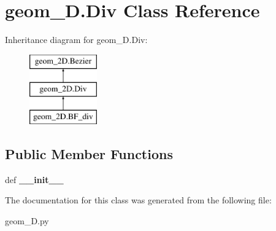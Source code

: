 \hypertarget{classgeom__2D_1_1Div}{\section{geom\-\_\-D.\-Div \-Class \-Reference}
\label{classgeom__2D_1_1Div}
}
\-Inheritance diagram for geom\-\_\-D.\-Div\-:\begin{figure}[H]
\begin{center}
\leavevmode
\includegraphics[height=3.000000cm]{classgeom__2D_1_1Div}
\end{center}
\end{figure}
\subsection*{\-Public \-Member \-Functions}
\begin{DoxyCompactItemize}
\item 
\hypertarget{classgeom__2D_1_1Div_aa765d65f15eebda96d87be39d9570808}{def {\bfseries \-\_\-\-\_\-init\-\_\-\-\_\-}}\label{classgeom__2D_1_1Div_aa765d65f15eebda96d87be39d9570808}

\end{DoxyCompactItemize}


\-The documentation for this class was generated from the following file\-:\begin{DoxyCompactItemize}
\item 
geom\-\_\-D.\-py\end{DoxyCompactItemize}

